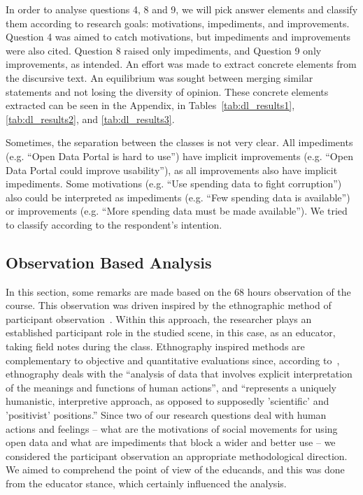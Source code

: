 In order to analyse questions 4, 8 and 9, we will pick answer elements and classify them according to research 
goals: motivations, impediments, and improvements. Question 4 was aimed to catch motivations, but impediments and improvements were also cited. Question 8 raised only impediments, and Question 9 only improvements, as intended.
An effort was made to extract concrete elements from the discursive text. An equilibrium was sought between merging similar statements and not losing the diversity of opinion. These concrete elements extracted can be seen in the Appendix, in Tables~\ref{tab:dl_results1}, \ref{tab:dl_results2}, and \ref{tab:dl_results3}.

Sometimes, the separation between the classes is not very clear. All impediments (e.g. “Open Data Portal is hard to use”) have implicit improvements (e.g. “Open Data Portal could improve usability”), as all improvements also have implicit impediments. Some motivations (e.g. “Use spending data to fight corruption”) also could be interpreted as impediments (e.g. “Few spending data is available”) or improvements (e.g. “More spending data must be made available”). We tried to classify according to the respondent's intention.

\subsection{Observation Based Analysis}

In this section, some remarks are made based on the 68 hours observation of the course. This observation was driven inspired by the ethnographic method of participant observation~\cite{Atkinson1994}. Within this approach, the researcher plays an established participant role in the studied scene, in this case, as an educator, taking field notes during the class. Ethnography inspired methods are complementary to objective and quantitative evaluations since, according to~, ethnography deals with the “analysis of data that involves explicit interpretation of the meanings and functions of human actions”, and “represents a uniquely humanistic, interpretive approach, as opposed to supposedly 'scientific' and 'positivist' positions.” Since two of our research questions deal with human actions and feelings – what are the motivations of social movements for using open data and what are impediments that block a wider and better use – we considered the participant observation an appropriate methodological direction. We aimed to comprehend the point of view of the educands, and this was done from the educator stance, which certainly influenced the analysis.

